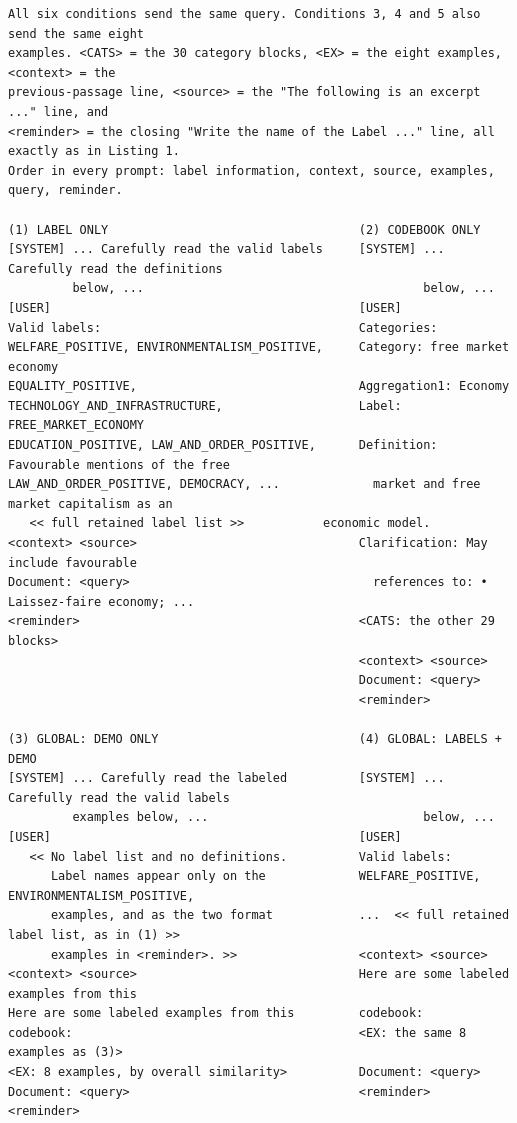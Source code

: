 \documentclass[11pt]{article}
\begin{document}
\begin{listing*}[tp]
\begin{lstlisting}
All six conditions send the same query. Conditions 3, 4 and 5 also send the same eight
examples. <CATS> = the 30 category blocks, <EX> = the eight examples, <context> = the
previous-passage line, <source> = the "The following is an excerpt ..." line, and
<reminder> = the closing "Write the name of the Label ..." line, all exactly as in Listing 1.
Order in every prompt: label information, context, source, examples, query, reminder.

(1) LABEL ONLY                                   (2) CODEBOOK ONLY
[SYSTEM] ... Carefully read the valid labels     [SYSTEM] ... Carefully read the definitions
         below, ...                                       below, ...
[USER]                                           [USER]
Valid labels:                                    Categories:
WELFARE_POSITIVE, ENVIRONMENTALISM_POSITIVE,     Category: free market economy
EQUALITY_POSITIVE,                               Aggregation1: Economy
TECHNOLOGY_AND_INFRASTRUCTURE,                   Label: FREE_MARKET_ECONOMY
EDUCATION_POSITIVE, LAW_AND_ORDER_POSITIVE,      Definition: Favourable mentions of the free
LAW_AND_ORDER_POSITIVE, DEMOCRACY, ...             market and free market capitalism as an
   << full retained label list >>           economic model.
<context> <source>                               Clarification: May include favourable
Document: <query>                                  references to: • Laissez-faire economy; ...
<reminder>                                       <CATS: the other 29 blocks>
                                                 <context> <source>
                                                 Document: <query>
                                                 <reminder>

(3) GLOBAL: DEMO ONLY                            (4) GLOBAL: LABELS + DEMO
[SYSTEM] ... Carefully read the labeled          [SYSTEM] ... Carefully read the valid labels
         examples below, ...                              below, ...
[USER]                                           [USER]
   << No label list and no definitions.          Valid labels:
      Label names appear only on the             WELFARE_POSITIVE, ENVIRONMENTALISM_POSITIVE,
      examples, and as the two format            ...  << full retained label list, as in (1) >>
      examples in <reminder>. >>                 <context> <source>
<context> <source>                               Here are some labeled examples from this
Here are some labeled examples from this         codebook:
codebook:                                        <EX: the same 8 examples as (3)>
<EX: 8 examples, by overall similarity>          Document: <query>
Document: <query>                                <reminder>
<reminder>


\end{lstlisting}
\end{listing*}
\end{document}
